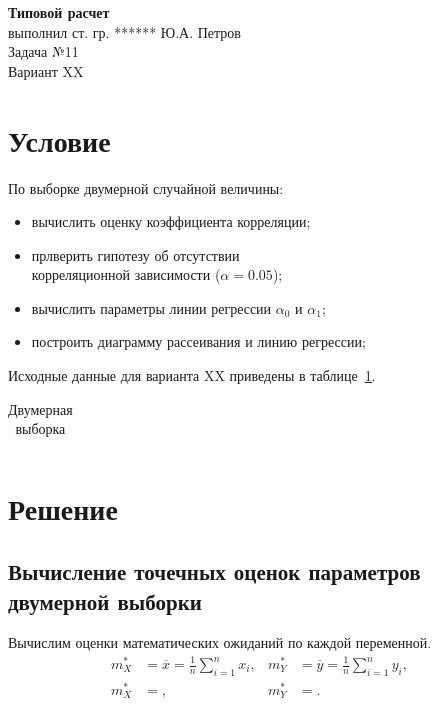 \documentclass[14pt,hidelinks]{extarticle}
\begin{document}


\begin{center}
	\textbf{Типовой расчет} \\ 
	выполнил ст. гр. ****** Ю.А. Петров \\
        Задача №11\\
	Вариант XX 
\end{center}

\section{Условие}

По выборке двумерной случайной величины:

\begin{itemize}
	\item вычислить оценку коэффициента корреляции;
        \item прлверить гипотезу об отсутствии \\
          корреляционной зависимости ($ \alpha = 0.05 $);
	\item вычислить параметры линии регрессии $ \alpha_0 $ и $ \alpha_1 $; 
	\item построить диаграмму рассеивания и линию регрессии;
\end{itemize}

Исходные данные для варианта XX приведены в таблице~\ref{tbl:second_sample}.

\begin{table}[h!]
  \renewcommand{\tabcolsep}{0.6em} 
	\centering
	\caption{Двумерная выборка\label{tbl:second_sample}}
	\begin{tabular}{llllllllll}
          
	\end{tabular}
\end{table}

\newpage

\section{Решение}

\subsection{Вычисление точечных оценок параметров двумерной выборки}

Вычислим оценки математических ожиданий по каждой переменной.
\begin{align}
  m^*_X &= \overline{x} = \frac{1}{n} \sum_{i=1}^{n} x_i, &
  m^*_Y &= \overline{y} = \frac{1}{n} \sum_{i=1}^{n} y_i, \\ \nonumber
  m^*_X &= , &
  m^*_Y &= .
\end{align}
\end{document}
